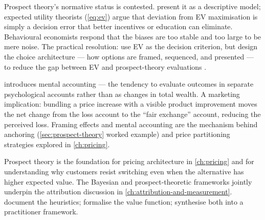 Prospect theory's normative status is contested. \textcite{kahneman1979prospect} present it as a
descriptive model; expected utility theorists (\cref{eq:ev}) argue that deviation from EV
maximisation is simply a decision error that better incentives or education can eliminate.
Behavioural economists respond that the biases are too stable and too large to be mere noise.
The practical resolution: use EV as the decision criterion, but design the choice architecture ---
how options are framed, sequenced, and presented --- to reduce the gap between EV and
prospect-theory evaluations \parencite{kahneman2011}.

\textcite{thaler1985mental} introduces mental accounting --- the tendency to evaluate outcomes in
separate psychological accounts rather than as changes in total wealth. A marketing implication:
bundling a price increase with a visible product improvement moves the net change from the loss
account to the ``fair exchange'' account, reducing the perceived loss. Framing effects and mental
accounting are the mechanism behind anchoring (\cref{sec:prospect-theory} worked example) and
price partitioning strategies explored in \cref{ch:pricing}.

Prospect theory is the foundation for pricing architecture in \cref{ch:pricing} and for
understanding why customers resist switching even when the alternative has higher expected value.
The Bayesian and prospect-theoretic frameworks jointly underpin the attribution discussion in
\cref{ch:attribution-and-measurement}. \textcite{tversky1974judgment} document the heuristics;
\textcite{kahneman1979prospect} formalise the value function; \textcite{kahneman2011} synthesise
both into a practitioner framework.

